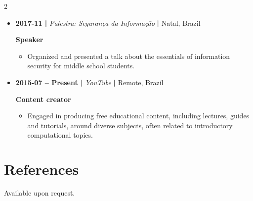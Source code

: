 \documentclass[a4paper,10pt]{article}
\begin{document}
\begin{multicols*}{2}
\begin{itemize}
\item \textbf{2017-11 |} \emph{Palestra: Segurança da Informação} \textbf{|} Natal, Brazil

\textbf{Speaker}
\begin{itemize}
\item Organized and presented a talk about the essentials of information security
for middle school students.
\end{itemize}

\item \textbf{2015-07 -- Present |} \emph{YouTube} \textbf{|} Remote, Brazil

\textbf{Content creator}
\begin{itemize}
\item Engaged in producing free educational content, including lectures, guides
and tutorials, around diverse subjects, often related to introductory
computational topics.
\end{itemize}
\end{itemize}
\section*{References}
\label{sec:org478533a}
Available upon request.

\end{multicols*}
\end{document}
